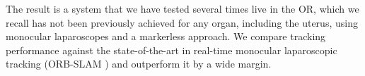 The result is a system that we have tested several times live in the OR, which we recall has not been previously achieved for any organ, including the uterus, using monocular laparoscopes and a markerless approach. We compare tracking performance against the state-of-the-art in real-time monocular laparoscopic tracking (ORB-SLAM \cite{orbslam_laparo}) and outperform it by a wide margin.







